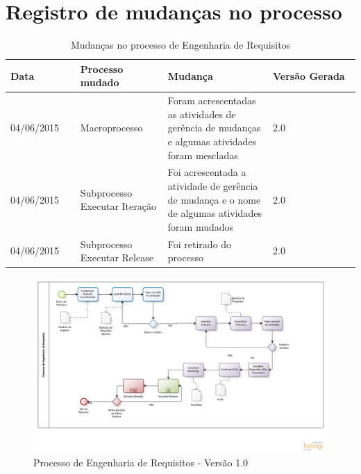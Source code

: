 \chapter{Registro de mudanças no processo}

\label{mudancas_processo}
\begin{table}[!h]
\centering
\caption{Mudanças no processo de Engenharia de Requisitos}
\label{Rotulo}
  \begin{tabular}{p{0.20\linewidth}p{0.25\linewidth}p{0.30\linewidth}p{0.25\linewidth}}
  \hline
  Data  & Processo mudado & Mudança & Versão Gerada \\
  \hline

  04/06/2015  & Macroprocesso & Foram acrescentadas as atividades de gerência de mudanças e algumas atividades foram mescladas & 2.0 \\
  04/06/2015  & Subprocesso Executar Iteração & Foi acrescentada a atividade de gerência de mudança e o nome de algumas atividades foram mudados & 2.0 \\
  04/06/2015  & Subprocesso Executar Release & Foi retirado do processo & 2.0 \\

  \hline
  \end{tabular}
\end{table}
\begin{figure}[!htb]
\flushleft
\includegraphics[scale=0.5]{figuras/processo1.png}
\caption{Processo de Engenharia de Requisitos - Versão 1.0}
\label{fig:Processo1}
\end{figure}

